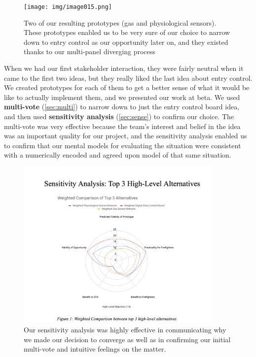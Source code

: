 \documentclass[a4paper,12pt]{article}
\begin{document}
\begin{figure}[H]
\centering
\texttt{[image: img/image015.png]}
\caption{Two of our resulting prototypes (gas and physiological sensors). These prototypes enabled us to be very sure of our choice to narrow down to entry control as our opportunity later on, and they existed thanks to our multi-panel diverging process}
\label{}
\end{figure}


When we had our first stakeholder interaction, they were fairly neutral when it came to the first two ideas, but they really liked the last idea about entry control. We created prototypes for each of them to get a better sense of what it would be like to actually implement them, and we presented our work at beta. We used \textbf{multi-vote} (\ref{sec:multi}) to narrow down to just the entry control board idea, and then used \textbf{sensitivity analysis} (\ref{sec:sense}) to confirm our choice. The multi-vote was very effective because the team’s interest and belief in the idea was an important quality for our project, and the sensitivity analysis enabled us to confirm that our mental models for evaluating the situation were consistent with a numerically encoded and agreed upon model of that same situation.

\begin{figure}[H]
\centering
\includegraphics[width=0.9\textwidth]{img/image016.png}
\caption{Our sensitivity analysis was highly effective in communicating why we made our decision to converge as well as in confirming our initial multi-vote and intuitive feelings on the matter.}
\label{}
\end{figure}
\end{document}
